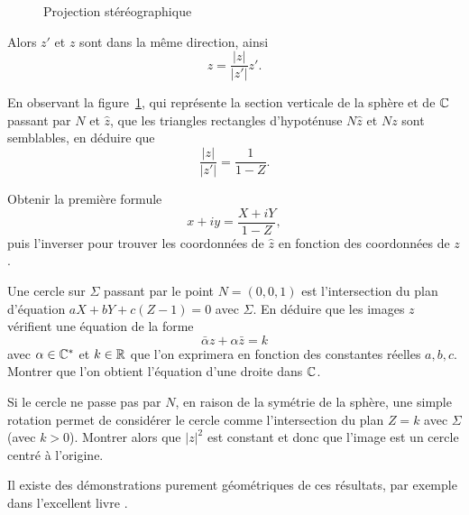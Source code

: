 \begin{exer}
\begin{figure}[ht]
\begin{center}
\shorthandon{!}\shorthandoff{:}
\caption{Projection stéréographique}\label{fig8}
\end{center}
\end{figure}

Alors $z'$ et $z$ sont dans la même direction, ainsi
\[z=\frac{\lvert z \rvert}{\lvert z' \rvert} z'.\]
\begin{MYenumerate}
\item En observant la figure~\ref{fig8}, qui représente la section verticale de la sphère et de $\mathbb{C}$ passant par $N$ et $\hat{z}$, que les triangles rectangles d'hypoténuse $N \hat{z}$ et $Nz$ sont semblables, en déduire que 
\[\frac{\lvert z \rvert}{\lvert z' \rvert} = \frac{1}{1-Z}.\]
\item Obtenir la première formule
\[x+iy = \frac{X+i Y}{1-Z},\]
puis l'inverser pour trouver les coordonnées de $\hat{z}$ en fonction des coordonnées de $z$.
\item Une cercle sur $\Sigma$ passant par le point $N=(0,0,1)$ est l'intersection du plan d'équation $a X + b Y +c(Z-1)=0$ avec $\Sigma$. En déduire que les images $z$ vérifient une équation de la forme
\[\bar{\alpha} z + \alpha \bar{z}=k \]
avec $\alpha  \in \mathbb{C}^\ast$ et $k \in \mathbb R$ que l'on exprimera en fonction des constantes réelles $a,b,c$. Montrer que l'on obtient l'équation d'une droite dans $\mathbb{C}$.
\item Si le cercle ne passe pas par $N$, en raison de la symétrie de la sphère, une simple rotation permet de considérer le cercle comme l'intersection du plan $Z=k$ avec $\Sigma$ (avec $k>0$). Montrer alors que $\lvert z\rvert ^2$ est constant et donc que l'image est un cercle centré à l'origine.  
\end{MYenumerate}
Il existe des démonstrations purement géométriques de ces résultats, par exemple dans l'excellent livre \cite{hilbert1983geometry}.
\end{exer}
